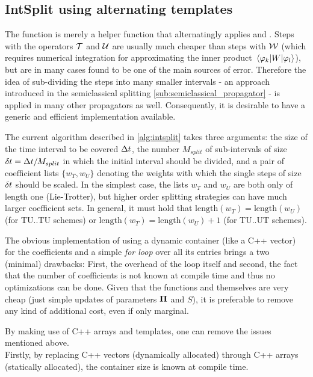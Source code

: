\subsection{IntSplit using alternating templates}
\label{subsec:intsplit}
%
The  function is merely a helper function that alternatingly applies  and .
Steps with the operators $\mathcal{T}$ and $\mathcal{U}$ are usually much cheaper than steps with $\mathcal{W}$ (which requires numerical integration for approximating the inner product $\matrixel{\varphi_k}{W}{\varphi_l}$), but are in many cases found to be one of the main sources of error.
Therefore the idea of sub-dividing the steps into many smaller intervals - an approach introduced in the semiclassical splitting \ref{sub:semiclassical_propagator} - is applied in many other propagators as well.
Consequently, it is desirable to have a generic and efficient implementation available.
\par\medskip
%
The current  algorithm described in \ref{alg:intsplit} takes three arguments:
the size of the time interval to be covered $\Delta t$, the number $M_{split}$ of sub-intervals of size $\delta t = \Delta t/M_{split}$ in which the initial interval should be divided, and a pair of coefficient lists $\{ w_T, w_U \}$ denoting the weights with which the single steps of size $\delta t$ should be scaled.
In the simplest case, the lists $w_T$ and $w_U$ are both only of length one (Lie-Trotter), but higher order splitting strategies can have much larger coefficient sets.
In general, it must hold that $\text{length}(w_T) = \text{length}(w_U)$ (for TU..TU schemes) or $\text{length}(w_T) = \text{length}(w_U)+1$ (for TU..UT schemes).
\par\medskip
%
The obvious implementation of using a dynamic container (like a C++ vector) for the coefficients and a simple \emph{for loop} over all its entries brings a two (minimal) drawbacks: First, the overhead of the loop itself and second, the fact that the number of coefficients is not known at compile time and thus no optimizations can be done.
Given that the functions  and  themselves are very cheap (just simple updates of parameters $\bm{\Pi}$ and $S$), it is preferable to remove any kind of additional cost, even if only marginal.
\par\medskip
%
By making use of C++ arrays and templates, one can remove the issues mentioned above. \\
%
Firstly, by replacing C++ vectors (dynamically allocated) through C++ arrays (statically allocated), the container size is known at compile time.
